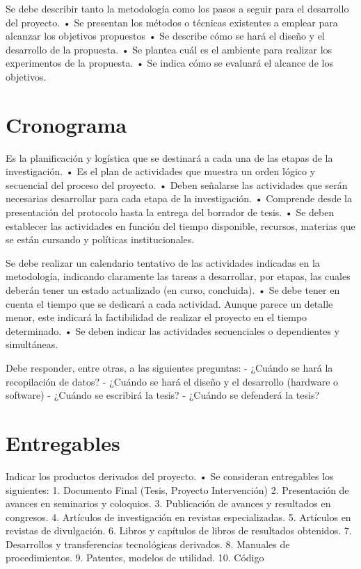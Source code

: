     Se debe describir tanto la metodología como los pasos a
    seguir para el desarrollo del proyecto.
    • Se presentan los métodos o técnicas existentes a emplear
    para alcanzar los objetivos propuestos
    • Se describe cómo se hará el diseño y el desarrollo de la
    propuesta.
    • Se plantea cuál es el ambiente para realizar los
    experimentos de la propuesta.
    • Se indica cómo se evaluará el alcance de los objetivos.


\section{Cronograma}
Es la planificación y logística que se destinará a cada una
de las etapas de la investigación.
• Es el plan de actividades que muestra un orden lógico y
secuencial del proceso del proyecto.
• Deben señalarse las actividades que serán necesarias
desarrollar para cada etapa de la investigación.
• Comprende desde la presentación del protocolo hasta la
entrega del borrador de tesis.
• Se deben establecer las actividades en función del tiempo
disponible, recursos, materias que se están cursando y
políticas institucionales.

Se debe realizar un calendario tentativo de las actividades
indicadas en la metodología, indicando claramente las
tareas a desarrollar, por etapas, las cuales deberán tener un
estado actualizado (en curso, concluida).
• Se debe tener en cuenta el tiempo que se dedicará a cada
actividad. Aunque parece un detalle menor, este indicará la
factibilidad de realizar el proyecto en el tiempo determinado.
• Se deben indicar las actividades secuenciales o
dependientes y simultáneas.

Debe responder, entre otras, a las siguientes preguntas:
- ¿Cuándo se hará la recopilación de datos?
- ¿Cuándo se hará el diseño y el desarrollo (hardware o
software)
- ¿Cuándo se escribirá la tesis?
- ¿Cuándo se defenderá la tesis?

\section{Entregables}
Indicar los productos derivados del proyecto.
• Se consideran entregables los siguientes:
1. Documento Final (Tesis, Proyecto Intervención)
2. Presentación de avances en seminarios y coloquios.
3. Publicación de avances y resultados en congresos.
4. Artículos de investigación en revistas especializadas.
5. Artículos en revistas de divulgación.
6. Libros y capítulos de libros de resultados obtenidos.
7. Desarrollos y transferencias tecnológicas derivados.
8. Manuales de procedimientos.
9. Patentes, modelos de utilidad.
10. Código